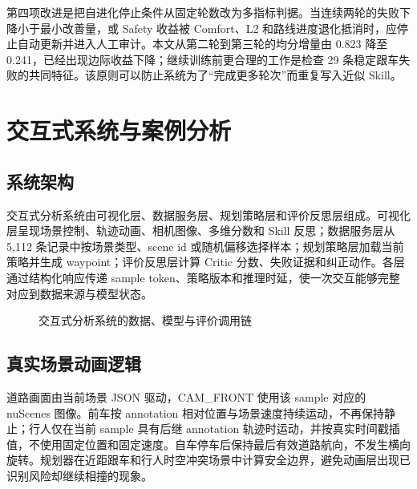 \documentclass[UTF8,a4paper,12pt,fontset=fandol]{ctexart}
\begin{document}
第四项改进是把自进化停止条件从固定轮数改为多指标判据。当连续两轮的失败下降小于最小改善量，或 Safety 收益被 Comfort、L2 和路线进度退化抵消时，应停止自动更新并进入人工审计。本文从第二轮到第三轮的均分增量由 0.823 降至 0.241，已经出现边际收益下降；继续训练前更合理的工作是检查 29 条稳定跟车失败的共同特征。该原则可以防止系统为了“完成更多轮次”而重复写入近似 Skill。

\section{交互式系统与案例分析}
\subsection{系统架构}
交互式分析系统由可视化层、数据服务层、规划策略层和评价反思层组成。可视化层呈现场景控制、轨迹动画、相机图像、多维分数和 Skill 反思；数据服务层从 5,112 条记录中按场景类型、scene id 或随机偏移选择样本；规划策略层加载当前策略并生成 waypoint；评价反思层计算 Critic 分数、失败证据和纠正动作。各层通过结构化响应传递 sample token、策略版本和推理时延，使一次交互能够完整对应到数据来源与模型状态。

\begin{figure}[!htbp]
\centering
{}
\caption{交互式分析系统的数据、模型与评价调用链}
\end{figure}

\subsection{真实场景动画逻辑}
道路画面由当前场景 JSON 驱动，CAM\_FRONT 使用该 sample 对应的 nuScenes 图像。前车按 annotation 相对位置与场景速度持续运动，不再保持静止；行人仅在当前 sample 具有后继 annotation 轨迹时运动，并按真实时间戳插值，不使用固定位置和固定速度。自车停车后保持最后有效道路航向，不发生横向旋转。规划器在近距跟车和行人时空冲突场景中计算安全边界，避免动画层出现已识别风险却继续相撞的现象。
\end{document}
